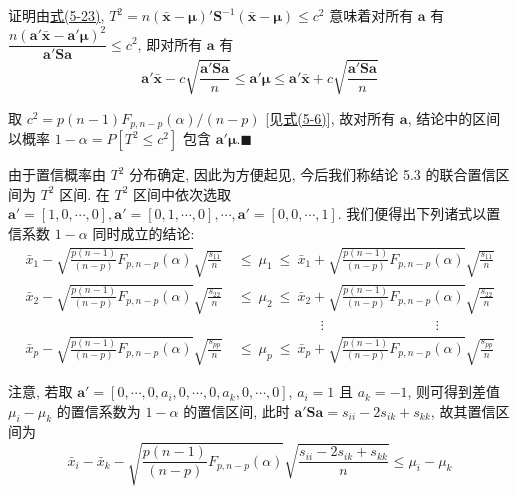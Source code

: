 证明\quad 由\hyperref[eq:5-23]{式(5-23)}, $T^{2}=n(\bar{\mathbf{x}}-\boldsymbol{\mu})'\mathbf{S}^{-1}(\bar{\mathbf{x}}-\boldsymbol{\mu})\le c^{2}$ 意味着对所有 $\mathbf{a}$ 有 $\dfrac{n(\mathbf{a}'\bar{\mathbf{x}}-\mathbf{a}'\boldsymbol{\mu})^{2}}{\mathbf{a}'\mathbf{S}\mathbf{a}}\le c^{2}$, 即对所有 $\mathbf{a}$ 有
\[
\mathbf{a}'\bar{\mathbf{x}}-c\sqrt{\frac{\mathbf{a}'\mathbf{S}\mathbf{a}}{n}}\le \mathbf{a}'\boldsymbol{\mu}\le \mathbf{a}'\bar{\mathbf{x}}+c\sqrt{\frac{\mathbf{a}'\mathbf{S}\mathbf{a}}{n}}
\]

取 $c^{2}=p(n-1)F_{p,n-p}(\alpha)/(n-p)$ [见\hyperref[eq:5-6]{式(5-6)}], 故对所有 $\mathbf{a}$, 结论中的区间以概率 $1-\alpha=P[T^{2}\le c^{2}]$ 包含 $\mathbf{a}'\boldsymbol{\mu}$.\hfill$\blacksquare$

由于置信概率由 $T^{2}$ 分布确定, 因此为方便起见, 今后我们称结论 5.3 的联合置信区间为 $T^{2}$ 区间. 在 $T^{2}$ 区间中依次选取 $\mathbf{a}'=[1,0,\cdots,0], \mathbf{a}'=[0,1,\cdots,0], \cdots, \mathbf{a}'=[0,0,\cdots,1]$. 我们便得出下列诸式以置信系数 $1-\alpha$ 同时成立的结论:
\label{eq:5-24}
\begin{equation}
\begin{aligned}
\bar{x}_{1}-\sqrt{\frac{p(n-1)}{(n-p)}F_{p,n-p}(\alpha)}\sqrt{\frac{s_{11}}{n}}\ &\le\ \mu_{1}\ \le\ \bar{x}_{1}+\sqrt{\frac{p(n-1)}{(n-p)}F_{p,n-p}(\alpha)}\sqrt{\frac{s_{11}}{n}}\\
\bar{x}_{2}-\sqrt{\frac{p(n-1)}{(n-p)}F_{p,n-p}(\alpha)}\sqrt{\frac{s_{22}}{n}}\ &\le\ \mu_{2}\ \le\ \bar{x}_{2}+\sqrt{\frac{p(n-1)}{(n-p)}F_{p,n-p}(\alpha)}\sqrt{\frac{s_{22}}{n}}\\
&\qquad\qquad\qquad\vdots\qquad\qquad\qquad\qquad\vdots\\
\bar{x}_{p}-\sqrt{\frac{p(n-1)}{(n-p)}F_{p,n-p}(\alpha)}\sqrt{\frac{s_{pp}}{n}}\ &\le\ \mu_{p}\ \le\ \bar{x}_{p}+\sqrt{\frac{p(n-1)}{(n-p)}F_{p,n-p}(\alpha)}\sqrt{\frac{s_{pp}}{n}}
\end{aligned} \tag{5-24}
\end{equation}

注意, 若取 $\mathbf{a}'=[0,\cdots,0,a_{i},0,\cdots,0,a_{k},0,\cdots,0]$, $a_{i}=1$ 且 $a_{k}=-1$, 则可得到差值 $\mu_{i}-\mu_{k}$ 的置信系数为 $1-\alpha$ 的置信区间, 此时 $\mathbf{a}'\mathbf{S}\mathbf{a}=s_{ii}-2s_{ik}+s_{kk}$, 故其置信区间为
\[
\bar{x}_{i}-\bar{x}_{k}-\sqrt{\frac{p(n-1)}{(n-p)}F_{p,n-p}(\alpha)}\sqrt{\frac{s_{ii}-2s_{ik}+s_{kk}}{n}}\le \mu_{i}-\mu_{k}
\]

